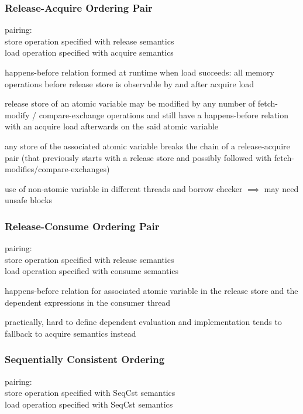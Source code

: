 \documentclass[8pt]{extarticle}
\begin{document}
\begin{multicols*}{2}
    \subsubsection{Release-Acquire Ordering Pair}
    pairing:\\
    store operation specified with release semantics\\
    load operation specified with acquire semantics

    happens-before relation formed at runtime when load succeeds: all memory operations before release store is observable by and after acquire load

    release store of an atomic variable may be modified by any number of fetch-modify / compare-exchange operations and still have a happens-before relation with an acquire load afterwards on the said atomic variable

    any store of the associated atomic variable breaks the chain of a release-acquire pair (that previously starts with a release store and possibly followed with fetch-modifies/compare-exchanges)

    use of non-atomic variable in different threads and borrow checker $\implies$ may need unsafe blocks
    
    \subsubsection{Release-Consume Ordering Pair}

    pairing:\\
    store operation specified with release semantics\\
    load operation specified with consume semantics

    happens-before relation for associated atomic variable in the release store and the dependent expressions in the consumer thread

    practically, hard to define dependent evaluation and implementation tends to fallback to acquire semantics instead
    
    \subsubsection{Sequentially Consistent Ordering}

    pairing:\\
    store operation specified with SeqCst semantics\\
    load operation specified with SeqCst semantics


\end{multicols*}
\end{document}
